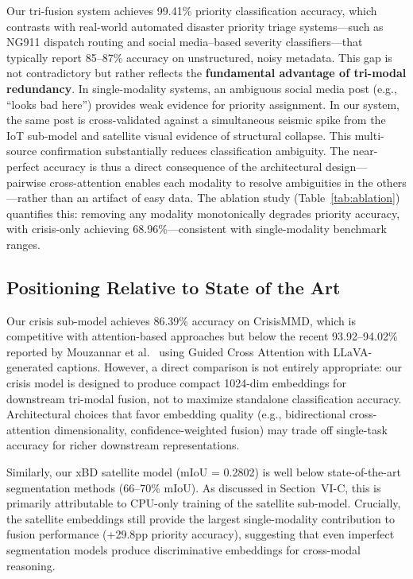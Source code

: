 \documentclass[journal]{IEEEtran}
\begin{document}
Our tri-fusion system achieves 99.41\% priority classification accuracy, which contrasts with real-world automated disaster priority triage systems---such as NG911 dispatch routing and social media--based severity classifiers---that typically report 85--87\% accuracy on unstructured, noisy metadata. This gap is not contradictory but rather reflects the \textbf{fundamental advantage of tri-modal redundancy}. In single-modality systems, an ambiguous social media post (e.g., ``looks bad here'') provides weak evidence for priority assignment. In our system, the same post is cross-validated against a simultaneous seismic spike from the IoT sub-model and satellite visual evidence of structural collapse. This multi-source confirmation substantially reduces classification ambiguity. The near-perfect accuracy is thus a direct consequence of the architectural design---pairwise cross-attention enables each modality to resolve ambiguities in the others---rather than an artifact of easy data. The ablation study (Table~\ref{tab:ablation}) quantifies this: removing any modality monotonically degrades priority accuracy, with crisis-only achieving 68.96\%---consistent with single-modality benchmark ranges.

\subsection{Positioning Relative to State of the Art}

Our crisis sub-model achieves 86.39\% accuracy on CrisisMMD, which is competitive with attention-based approaches but below the recent 93.92--94.02\% reported by Mouzannar et al.~\cite{mouzannar2025guidedcross} using Guided Cross Attention with LLaVA-generated captions. However, a direct comparison is not entirely appropriate: our crisis model is designed to produce compact 1024-dim embeddings for downstream tri-modal fusion, not to maximize standalone classification accuracy. Architectural choices that favor embedding quality (e.g., bidirectional cross-attention dimensionality, confidence-weighted fusion) may trade off single-task accuracy for richer downstream representations.

Similarly, our xBD satellite model (mIoU = 0.2802) is well below state-of-the-art segmentation methods (66--70\% mIoU). As discussed in Section~VI-C, this is primarily attributable to CPU-only training of the satellite sub-model. Crucially, the satellite embeddings still provide the largest single-modality contribution to fusion performance (+29.8pp priority accuracy), suggesting that even imperfect segmentation models produce discriminative embeddings for cross-modal reasoning.
\end{document}

